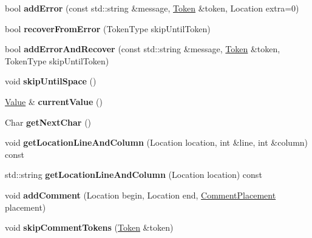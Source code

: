 \begin{DoxyCompactItemize}
\item 
\hypertarget{class_json_1_1_reader_a04a3a13dbc609dfdf9e3c6723e37ff21}{bool {\bfseries add\-Error} (const std\-::string \&message, \hyperlink{class_json_1_1_reader_1_1_token}{Token} \&token, Location extra=0)}\label{class_json_1_1_reader_a04a3a13dbc609dfdf9e3c6723e37ff21}

\item 
\hypertarget{class_json_1_1_reader_a8d4ed03a43082c5ace81ba5b81425eaf}{bool {\bfseries recover\-From\-Error} (Token\-Type skip\-Until\-Token)}\label{class_json_1_1_reader_a8d4ed03a43082c5ace81ba5b81425eaf}

\item 
\hypertarget{class_json_1_1_reader_af47fb7564db6ac21faebaba8cebb41ce}{bool {\bfseries add\-Error\-And\-Recover} (const std\-::string \&message, \hyperlink{class_json_1_1_reader_1_1_token}{Token} \&token, Token\-Type skip\-Until\-Token)}\label{class_json_1_1_reader_af47fb7564db6ac21faebaba8cebb41ce}

\item 
\hypertarget{class_json_1_1_reader_ad922ea5a8ab333084edbb84827861fa3}{void {\bfseries skip\-Until\-Space} ()}\label{class_json_1_1_reader_ad922ea5a8ab333084edbb84827861fa3}

\item 
\hypertarget{class_json_1_1_reader_a85597f763fb0148a17359b6dfc6f7326}{\hyperlink{class_json_1_1_value}{Value} \& {\bfseries current\-Value} ()}\label{class_json_1_1_reader_a85597f763fb0148a17359b6dfc6f7326}

\item 
\hypertarget{class_json_1_1_reader_ab61eb61333cc9ec3afe785663a53ce90}{Char {\bfseries get\-Next\-Char} ()}\label{class_json_1_1_reader_ab61eb61333cc9ec3afe785663a53ce90}

\item 
\hypertarget{class_json_1_1_reader_a20b3023dc422726e2e4ebe41b8ba0515}{void {\bfseries get\-Location\-Line\-And\-Column} (Location location, int \&line, int \&column) const }\label{class_json_1_1_reader_a20b3023dc422726e2e4ebe41b8ba0515}

\item 
\hypertarget{class_json_1_1_reader_ac5b4b5a76d3224871519b0656393b35b}{std\-::string {\bfseries get\-Location\-Line\-And\-Column} (Location location) const }\label{class_json_1_1_reader_ac5b4b5a76d3224871519b0656393b35b}

\item 
\hypertarget{class_json_1_1_reader_aaea3bd62d12ffb6117a61476c0685049}{void {\bfseries add\-Comment} (Location begin, Location end, \hyperlink{namespace_json_a4fc417c23905b2ae9e2c47d197a45351}{Comment\-Placement} placement)}\label{class_json_1_1_reader_aaea3bd62d12ffb6117a61476c0685049}

\item 
\hypertarget{class_json_1_1_reader_a22e677ef400d8223f27e631b4cd4b821}{void {\bfseries skip\-Comment\-Tokens} (\hyperlink{class_json_1_1_reader_1_1_token}{Token} \&token)}\label{class_json_1_1_reader_a22e677ef400d8223f27e631b4cd4b821}

\end{DoxyCompactItemize}
